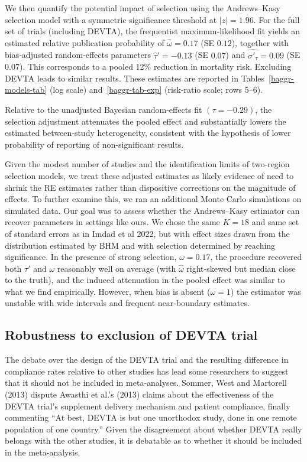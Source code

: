 \documentclass[12pt]{article}
\begin{document}
We then quantify the potential impact of selection using the Andrews–Kasy selection model with a symmetric significance threshold at \(|z|=1.96\). For the full set of trials (including DEVTA), the frequentist maximum‐likelihood fit yields an estimated relative publication probability of \(\hat\omega=0.17\) (SE \(0.12\)), together with bias‐adjusted random‐effects parameters \(\hat\tau'=-0.13\) (SE \(0.07\)) and \(\widehat{\sigma'_{\tau}}=0.09\) (SE \(0.07\)). This corresponds to a pooled 12\% reduction in mortality risk.
Excluding DEVTA leads to similar results. These estimates are reported in Tables~\ref{baggr-models-tab} (log scale) and~\ref{baggr-tab-exp} (risk‐ratio scale; rows 5–6).

Relative to the unadjusted Bayesian random‐effects fit $(\tau =  -0.29)$, the selection adjustment attenuates the pooled effect and substantially lowers the estimated between‐study heterogeneity, consistent with the hypothesis of lower probability of reporting of non-significant results. 

Given the modest number of studies and the identification limits of two‐region selection models, we treat these adjusted estimates as likely evidence of need to shrink the RE estimates rather than dispositive corrections on the magnitude of effects. To further examine this, we ran an additional Monte Carlo simulations on simulated data. Our 
goal was to assess whether the Andrews–Kasy estimator can recover parameters in settings like ours. We chose the same $K = 18$ and same set of standard errors as in Imdad et al 2022, but with effect sizes drawn from the distribution estimated by BHM and with selection determined by reaching significance. In the presence of strong selection, $\omega = 0.17$, the procedure recovered both \(\tau'\) and \(\omega\) reasonably well on average (with \(\hat\omega\) right‐skewed but median close to the truth), and the induced attenuation in the pooled effect was similar to what we find empirically. However, when bias is absent (\(\omega=1\)) the estimator was unstable with wide intervals and frequent near‐boundary estimates.


\subsection{Robustness to exclusion of DEVTA trial}

The debate over the design of the DEVTA trial and the resulting difference in compliance rates relative to other studies has lead some researchers to suggest that it should not be included in meta-analyses. Sommer, West and Martorell (2013) dispute Awasthi et al.'s (2013) claims about the effectiveness of the DEVTA trial's supplement delivery mechanism and patient compliance, finally commenting ``At best, DEVTA is but one unorthodox study, done in one remote population of one country.'' Given the disagreement about whether DEVTA really belongs with the other studies, it is debatable as to whether it should be included in the meta-analysis.
\end{document}
